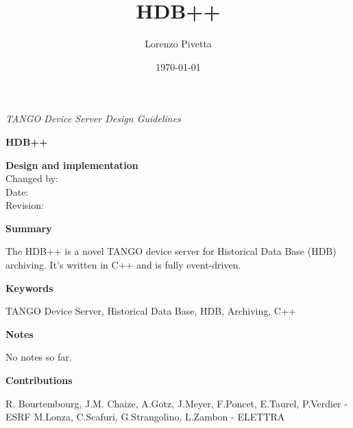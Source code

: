 \documentclass[11pt,a4paper]{article}
\title{HDB++}
\author{Lorenzo Pivetta}
\date{\today}
\def \hdb{HDB++}
\def \tango{TANGO}
\begin{document}

\thispagestyle{empty}
\begin{center}
	\hspace{1.5cm}
	\emph{\tango{} Device Server Design Guidelines}
	\vspace{2cm}
	\newline
	\begin{LARGE}
		\textbf{\hdb} \\
	\end{LARGE}
	\vspace{1cm}
	\textbf{Design and implementation} \\
	\vspace{15cm}
	Changed by: \svnFullAuthor{\svnauthor} \\
	Date: \svndate \\
	Revision: \svnrev \\
\end{center}

\newpage

\begin{Large}
	\textbf{Summary}
\end{Large}
\newline
The \hdb{} is a novel \tango{} device server for Historical Data Base
(HDB) archiving. It's written in C++ and is fully event-driven.
\vspace{2cm}

\begin{Large}
	\textbf{Keywords}
\end{Large}
\newline
\tango{} Device Server, Historical Data Base, HDB, Archiving, C++
\vspace{2cm}
	
\begin{Large}
	\textbf{Notes}
\end{Large}
\newline
No notes so far.
\vspace{2cm}

\begin{Large}
	\textbf{Contributions}
\end{Large}
\newline
R. Bourtembourg, J.M. Chaize, A.Gotz, J.Meyer, F.Poncet, E.Taurel, P.Verdier - ESRF
\newline
M.Lonza, C.Scafuri, G.Strangolino, L.Zambon - ELETTRA
\vspace{2cm}
\end{document}
